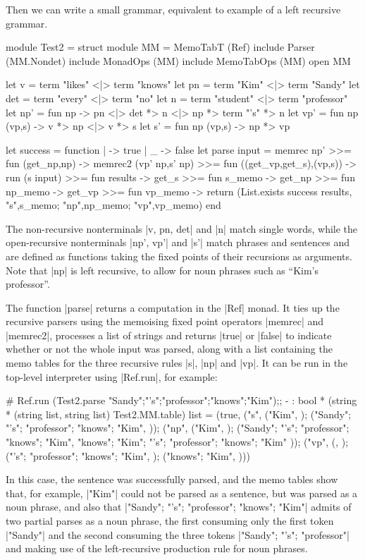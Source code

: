 \vspace{0.5em}
Then we can write a small grammar, equivalent to  
example of a left recursive grammar.
\vspace{0.5em}
\begin{ocaml}
	module Test2 = struct
		module MM = MemoTabT (Ref)
		include Parser (MM.Nondet)
		include MonadOps (MM)
		include MemoTabOps (MM)
		open MM

		let v   = term "likes" <|> term "knows" 
		let pn  = term "Kim" <|> term "Sandy" 
		let det = term "every" <|> term "no" 
		let n   = term "student" <|> term "professor" 
		let np' = fun np -> pn <|> det *> n <|> np *> term "'s" *> n
		let vp' = fun np (vp,s) -> v *> np <|> v *> s
		let s'  = fun np (vp,s) -> np *> vp

		let success = function | {} -> true | _ -> false
		let parse input =
			memrec np' >>= fun (get_np,np) ->
			memrec2 (vp' np,s' np) >>= fun ((get_vp,get_s),(vp,s)) ->
			run (s input) >>= fun results ->
			get_s >>= fun s_memo ->
			get_np >>= fun np_memo ->
			get_vp >>= fun vp_memo ->
			return (List.exists success results, 
						  {"s",s_memo; "np",np_memo; "vp",vp_memo})
	end
\end{ocaml}
The non-recursive nonterminals |v, pn, det| and |n| match single words, while the
open-recursive nonterminals |np', vp'| and |s'| match phrases and sentences and 
are defined as functions taking the fixed points of their recursions as arguments.
Note that |np| is left recursive, to allow for noun phrases such as ``Kim's professor''.

The function |parse| returns a computation in the |Ref| monad. It ties up the 
recursive parsers using the memoising fixed point
operators |memrec| and |memrec2|, processes a list of strings and returns |true| or |false| to 
indicate whether or not the whole input was parsed, along with a list containing the
memo tables for the three recursive rules |s|, |np| and |vp|. It can be run in the 
\OCaml top-level interpreter using
|Ref.run|, for example:
\begin{ocaml-tt}
	# Ref.run (Test2.parse {"Sandy";"'s";"professor";"knows";"Kim"});;
	- : bool * (string * (string list, string list) Test2.MM.table) list =
	(true,
	 {("s", {({"Kim"}, {});
				   ({"Sandy"; "'s"; "professor"; "knows"; "Kim"}, { {} })});
	  ("np", {({"Kim"}, { {} });
				    ({"Sandy"; "'s"; "professor"; "knows"; "Kim"},
				     { {"knows"; "Kim"}; 
				       {"'s"; "professor"; "knows"; "Kim"} })});
	  ("vp", {({}, {}); 
				    ({"'s"; "professor"; "knows"; "Kim"}, {});
				    ({"knows"; "Kim"}, { {} })})})
\end{ocaml-tt}
In this case, the sentence was successfully parsed, and the memo tables show that,
for example, |{"Kim"}| could not be parsed as a sentence, but was 
parsed as a noun phrase, and also that |{"Sandy"; "'s"; "professor"; "knows"; "Kim"}|
admits of two partial parses as a noun phrase, the first consuming only the first token
|"Sandy"| and the second consuming the three tokens |{"Sandy"; "'s"; "professor"}|
and making use of the left-recursive production rule for noun phrases.

